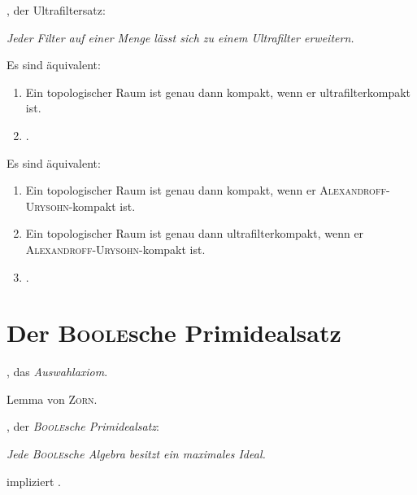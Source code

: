 \begin{defn}
    \UFT, der Ultrafiltersatz: 
      \begin{addmargin}[2em]{2em}%
        \textit{Jeder Filter auf einer Menge lässt sich zu einem Ultrafilter erweitern.}
      \end{addmargin}
\end{defn}

\begin{thm}
  Es sind äquivalent:
  \begin{enumerate}
    \item Ein topologischer Raum ist genau dann kompakt, wenn er ultrafilterkompakt ist.
    \item \UFT.
  \end{enumerate}
\end{thm}

\begin{thm}
  Es sind äquivalent:
  \begin{enumerate}[(1)]
    \item Ein topologischer Raum ist genau dann kompakt, wenn er \textsc{Alexandroff}-\textsc{Urysohn}-kompakt ist.
    \item Ein topologischer Raum ist genau dann ultrafilterkompakt, wenn er \textsc{Alexandroff}-\textsc{Urysohn}-kompakt ist.
    \item \UFT.
  \end{enumerate}
\end{thm}

\section{Der \textsc{Boole}sche Primidealsatz}

\begin{defn}
 \item \AC, das \textit{Auswahlaxiom}.
 \item Lemma von \textsc{Zorn}.
\end{defn}

\begin{defn}
    \PIT, der \textit{\textsc{Boole}sche Primidealsatz}:
      \begin{addmargin}[2em]{2em}%
        \textit{Jede \textsc{Boole}sche Algebra besitzt ein maximales Ideal.}
      \end{addmargin}
\end{defn}

\begin{thm}
  \label{thm:acpit}
  \AC impliziert \PIT.
\end{thm}

